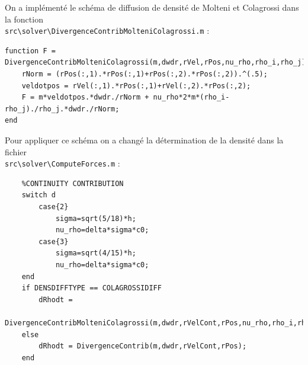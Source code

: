 \documentclass{article}
\begin{document}
On a implémenté le schéma de diffusion de densité de Molteni et Colagrossi dans la fonction \\
\lstinline$src\solver\DivergenceContribMolteniColagrossi.m$ :
\begin{lstlisting}           
function F = DivergenceContribMolteniColagrossi(m,dwdr,rVel,rPos,nu_rho,rho_i,rho_j)
    rNorm = (rPos(:,1).*rPos(:,1)+rPos(:,2).*rPos(:,2)).^(.5);
    veldotpos = rVel(:,1).*rPos(:,1)+rVel(:,2).*rPos(:,2);
    F = m*veldotpos.*dwdr./rNorm + nu_rho*2*m*(rho_i-rho_j)./rho_j.*dwdr./rNorm;
end
\end{lstlisting} 

Pour appliquer ce schéma on a changé la détermination de la densité dans la fichier \\
\lstinline$src\solver\ComputeForces.m$ :
\begin{lstlisting}           
    %CONTINUITY CONTRIBUTION
    switch d
        case{2}
            sigma=sqrt(5/18)*h;
            nu_rho=delta*sigma*c0;
        case{3}
            sigma=sqrt(4/15)*h;
            nu_rho=delta*sigma*c0;
    end
    if DENSDIFFTYPE == COLAGROSSIDIFF
        dRhodt = 
            DivergenceContribMolteniColagrossi(m,dwdr,rVelCont,rPos,nu_rho,rho_i,rho_j);
    else
        dRhodt = DivergenceContrib(m,dwdr,rVelCont,rPos);
    end
\end{lstlisting} 
\end{document}
